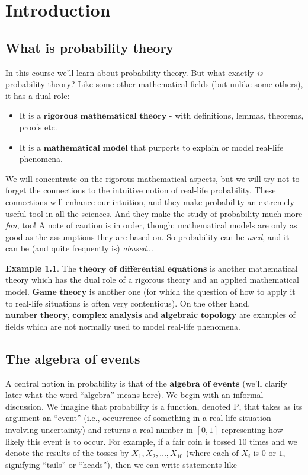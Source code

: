 \documentclass[11pt]{report}
\theoremstyle{plain}
\theoremstyle{definition}
\newtheorem{example}[thm]{Example}
\begin{document}
\chapter{Introduction}

\section{What is probability theory}
In this course we'll learn about probability theory.
But what exactly \emph{is} probability theory? Like some
other mathematical fields (but unlike some others), it
has a dual role:

\begin{itemize}
\item It is a $\textbf{rigorous mathematical theory}$ -
with definitions, lemmas, theorems, proofs etc.

\item It is a $\textbf{mathematical model}$ that purports
to explain or model real-life phenomena.
\end{itemize}

We will concentrate on the rigorous mathematical
aspects, but we will try not to forget the connections
to the intuitive notion of real-life probability.
These connections will enhance our intuition, and they
make probability an extremely useful tool in all the
sciences. And they make the study of probability much
more \emph{fun}, too! A note of caution is in order,
though: mathematical models are only as good as the
assumptions they are based on. So probability can be
\emph{used}, and it can be (and quite frequently is)
\emph{abused}...

\begin{example}
The $\textbf{theory of differential equations}$ is
another mathematical theory which has the dual role of
a rigorous theory and an applied mathematical model.
$\textbf{Game theory}$ is another one (for which the
question of how to apply it to real-life situations is
often very contentious). On the other hand,
$\textbf{number theory}$, $\textbf{complex analysis}$
and $\textbf{algebraic topology}$ are examples of
fields which are not normally used to model real-life
phenomena.
\end{example}

\section{The algebra of events}
A central notion in probability is that of the
$\textbf{algebra of events}$ (we'll clarify later
what the word ``algebra'' means here). We begin with
an informal discussion. We imagine that probability is
a function, denoted $\mathrm{P}$, that takes as its
argument an ``event'' (i.e., occurrence of something
in a real-life situation involving uncertainty) and
returns a real number in $[0,1]$ representing how
likely this event is to occur. For example, if a fair
coin is tossed 10 times and we denote the results of
the tosses by $X_1,X_2,\ldots,X_{10}$ (where each of
$X_i$ is $0$ or $1$, signifying ``tails'' or
``heads''), then we can write statements like
\end{document}
